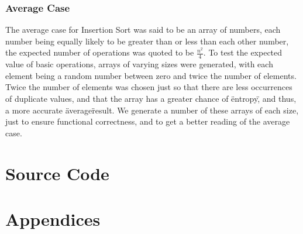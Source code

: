 \documentclass{article}
\begin{document}
        \subsubsection{Average Case}
            The average case for Insertion Sort was said to be an array of numbers, each number being equally likely to be greater than or less than each other number, the expected number of operations was quoted to be $\frac{n^2}{4}$. To test the expected value of basic operations, arrays of varying sizes were generated, with each element being a random number between zero and twice the number of elements. Twice the number of elements was chosen just so that there are less occurrences of duplicate values, and that the array has a greater chance of \"entropy\", and thus, a more accurate \"average\" result. We generate a number of these arrays of each size, just to ensure functional correctness, and to get a better reading of the average case.

    \section{Source Code}
    \newpage

\section{Appendices}
\end{document}
